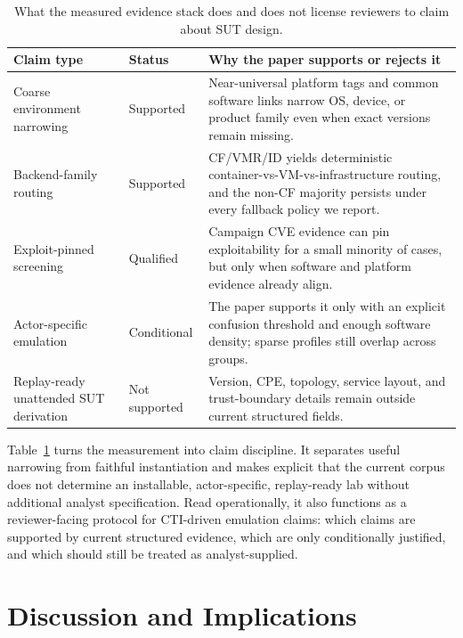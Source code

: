 \documentclass[sigconf]{acmart}
\begin{document}
\begin{table}[!t]
\caption{What the measured evidence stack does and does not license reviewers to claim about SUT design.}\label{tab:claim_boundary}
\centering\footnotesize
\begin{tabular}{@{}>{\raggedright\arraybackslash}p{2.25cm}>{\raggedright\arraybackslash}p{1.1cm}>{\raggedright\arraybackslash}p{3.2cm}@{}}
\toprule
\textbf{Claim type} & \textbf{Status} & \textbf{Why the paper supports or rejects it} \\
\midrule
Coarse environment narrowing & Supported & Near-universal platform tags and common software links narrow OS, device, or product family even when exact versions remain missing. \\
Backend-family routing & Supported & CF/VMR/ID yields deterministic container-vs-VM-vs-infrastructure routing, and the non-CF majority persists under every fallback policy we report. \\
Exploit-pinned screening & Qualified & Campaign CVE evidence can pin exploitability for a small minority of cases, but only when software and platform evidence already align. \\
Actor-specific emulation & Conditional & The paper supports it only with an explicit confusion threshold and enough software density; sparse profiles still overlap across groups. \\
Replay-ready unattended SUT derivation & Not supported & Version, CPE, topology, service layout, and trust-boundary details remain outside current structured fields. \\
\bottomrule
\end{tabular}
\end{table}

Table~\ref{tab:claim_boundary} turns the measurement into claim discipline. It separates useful narrowing from faithful instantiation and makes explicit that the current corpus does not determine an installable, actor-specific, replay-ready lab without additional analyst specification. Read operationally, it also functions as a reviewer-facing protocol for CTI-driven emulation claims: which claims are supported by current structured evidence, which are only conditionally justified, and which should still be treated as analyst-supplied.

\section{Discussion and Implications}\label{sec:discussion}
\end{document}
